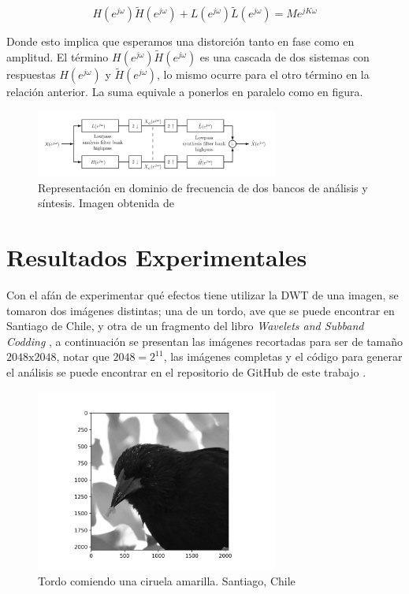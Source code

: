 \documentclass[conference]{IEEEtran}
\begin{document}
\begin{equation}
    H(e^{j\omega})\tilde{H}(e^{j\omega}) + L(e^{j\omega})\tilde{L}(e^{j\omega}) = Me^{jK\omega}
\end{equation}

Donde esto implica que esperamos una distorción tanto en fase como en amplitud. El término $H(e^{j\omega})\tilde{H}(e^{j\omega})$ es una cascada de dos sistemas con respuestas $H(e^{j\omega})$ y $\tilde{H}(e^{j\omega})$, lo mismo ocurre para el otro término en la relación anterior. La suma equivale a ponerlos en paralelo como en figura.




\begin{figure}[H]
\includegraphics[width=8cm]{images/filter.png}
\caption{Representación en dominio de frecuencia de dos bancos de análisis y síntesis. Imagen obtenida de \cite{dwt}}
\end{figure}


\section{Resultados Experimentales}

Con el afán de experimentar qué efectos tiene utilizar la DWT de una imagen, se tomaron dos imágenes distintas; una de un tordo, ave que se puede encontrar en Santiago de Chile, y otra de un fragmento del libro \emph{Wavelets and Subband Codding} \cite{waveletsandsubbandcoding}, a continuación se presentan las imágenes recortadas para ser de tamaño $2048\text{x}2048$, notar que $2048 = 2^{11}$, las imágenes completas y el código para generar el análisis se puede encontrar en el repositorio de GitHub de este trabajo  \cite{repo}.


\begin{figure}[H]
\includegraphics[width=8cm]{images/tordo_cut.png}
\caption{Tordo comiendo una ciruela amarilla. Santiago, Chile}
\end{figure}
\end{document}
